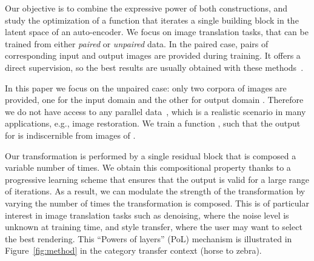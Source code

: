 \documentclass[a4paper,10pt]{extarticle}
\begin{document}
Our objective is to combine the expressive power of both  constructions, and study 
the optimization of a function that iterates a single building block in the latent space of an auto-encoder. 
We focus on image translation tasks, that can be trained from either \emph{paired} or \emph{unpaired} data.
In the paired case, pairs of corresponding input and output images are provided during training. It offers a direct supervision, so the best results are usually obtained with these methods~\cite{chen2017fast,wang2018pix2pixHD,park2019SPADE}.

In this paper we focus on the unpaired case: only two corpora of images are provided, one for the input domain  and the other for output domain . Therefore we do not have access to any parallel data~\cite{conneau2017word}, which is a  realistic scenario in many applications, e.g., image restoration. 
We train a function , such that the output  for  is indiscernible from images of . 


Our transformation is performed by a single residual block that is composed a variable number of times. 
We obtain this compositional property thanks to a progressive learning scheme that ensures that the output is valid for a large range of iterations.
As a result, we can modulate the strength of the transformation by varying the number of times the transformation is composed. This is of particular interest in image translation tasks such as denoising, where the noise level is unknown at training time, and style transfer, where the user may want to select the best rendering. 
This ``Powers of layers'' (PoL) mechanism is illustrated in Figure~\ref{fig:method} in the category transfer context (horse to zebra).
\end{document}
